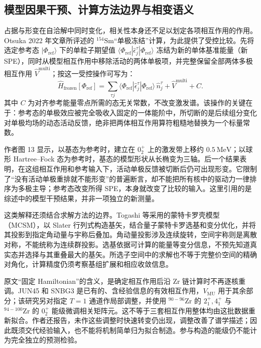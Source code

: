 \subsection{模型因果干预、计算方法边界与相变语义}\label{sec:2-2-4}


占据与形变在自洽解中同时变化，相关性本身还不足以划定各项相互作用的作用。Otsuka 2022 年文章所评述的 $^{154}\mathrm{Sm}$“单极冻结”计算，为此提供了受控比较。先将选定参考态 $|\Phi_{\mathrm{ref}}\rangle$ 下的单粒子期望值 $\langle\Phi_{\mathrm{ref}}|\hat\epsilon_j^\tau|\Phi_{\mathrm{ref}}\rangle$ 冻结为新的单体基准能量（新 SPE），同时从模型相互作用中移除活动的两体单极项，并完整保留全部两体多极相互作用 $\hat V^{\mathrm{multi}}$；按这一受控操作可写为：
\begin{equation}\label{eq:2-2-14}
\hat H_{\mathrm{frozen}}[\Phi_{\mathrm{ref}}]
=\sum_{\tau j}\langle\Phi_{\mathrm{ref}}|\hat\epsilon_j^\tau
|\Phi_{\mathrm{ref}}\rangle\,\hat n_j^\tau
+\hat V^{\mathrm{multi}}+C.
\end{equation}
其中 $C$ 为对齐参考能量零点所需的态无关常数，不改变激发谱。该操作的关键在于：参考态的单极效应被完全吸收入固定的一体能阶中，所切断的是后续组分变化对单极均场的动态活动反馈，绝非把两体相互作用算符粗糙地替换为一个标量常数。\cite{doctoral-r1-g28-otsuka-2023-type-ii-shell-evolution}

作者图 13 显示，以基态为参考时，建立在 $0_2^+$ 上的激发带上移约 $0.5\ \mathrm{MeV}$；以球形 Hartree–Fock 态为参考时，基态的模型形状从长椭变为三轴。后一个结果表明，在这组相互作用和参考输入下，活动单极反馈被切断后仍可出现形变。它限制了“没有活动单极重排就不能形变”的普遍断言，却不能把所有核中的驱动力一律排序为多极主导；参考态改变所得 SPE，本身就改变了比较的输入。这里引用的是综述中的模型干预结果，并非一项独立的新测量。

这类解释还须结合求解方法的边界。Togashi 等采用的蒙特卡罗壳模型（\allowbreak{}MCSM），以 Slater 行列式构造基矢，结合量子蒙特卡罗选基和变分优化，并将其投影到指定角动量与宇称后叠加。角动量投影涉及连续旋转，空间宇称则是离散对称，不能统称为连续群投影。选基依据可计算的能量等变分信息，不预先知道真实态并选择与其重叠最大的基矢。所选子空间中的求解也不等于完整价空间的精确对角化，计算精度仍须考察基组扩展和相应收敛信息。\cite{doctoral-r1-g28-togashi-2016-zr-mcsm-qpt}

原文“固定 Hamiltonian”的含义，是确定相互作用后沿 Zr 链计算时不再逐核重调。JUN45 和 SNBG3 是已有的、含经验信息的有效相互作用，$V_{\mathrm{MU}}$ 用于其余部分；该研究另对指定 $T=1$ 通道作局部调整，并使用 $^{90-96}\mathrm{Zr}$ 的 $2_1^+,4_1^+$ 与 $^{94-100}\mathrm{Zr}$ 的 $0_2^+$ 能级微调相关矩阵元。这不等于三套相互作用整体均由这批数据重新拟合。作者还报告，未作这些调整时快速转变仍出现，调整改善了谱学描述；因此既须交代经验输入，也不能将机制简单归为拟合制造。参与构造的能级仍不能计为完全独立的预测检验。

